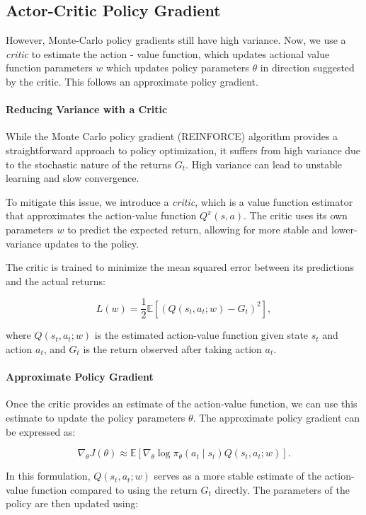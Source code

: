 \documentclass[10pt, oneside]{article}
\theoremstyle{definition}
\begin{document}
\subsection{Actor-Critic Policy Gradient}
However, Monte-Carlo policy gradients still have high variance. Now, we use a \textit{critic} to estimate the action - value function, which updates actional value function parameters $w$ which updates policy parameters $\theta$ in direction suggested by the critic. This follows an approximate policy gradient. 


\paragraph{Reducing Variance with a Critic}

While the Monte Carlo policy gradient (REINFORCE) algorithm provides a straightforward approach to policy optimization, it suffers from high variance due to the stochastic nature of the returns \( G_t \). High variance can lead to unstable learning and slow convergence.

To mitigate this issue, we introduce a \textit{critic}, which is a value function estimator that approximates the action-value function \( Q^\pi(s, a) \). The critic uses its own parameters \( w \) to predict the expected return, allowing for more stable and lower-variance updates to the policy.

The critic is trained to minimize the mean squared error between its predictions and the actual returns:

\[
L(w) = \frac{1}{2} \mathbb{E} \left[ \left( Q(s_t, a_t; w) - G_t \right)^2 \right],
\]

where \( Q(s_t, a_t; w) \) is the estimated action-value function given state \( s_t \) and action \( a_t \), and \( G_t \) is the return observed after taking action \( a_t \).

\paragraph{Approximate Policy Gradient}

Once the critic provides an estimate of the action-value function, we can use this estimate to update the policy parameters \( \theta \). The approximate policy gradient can be expressed as:

\[
\nabla_\theta J(\theta) \approx \mathbb{E} \left[ \nabla_\theta \log \pi_\theta(a_t \mid s_t) Q(s_t, a_t; w) \right].
\]

In this formulation, \( Q(s_t, a_t; w) \) serves as a more stable estimate of the action-value function compared to using the return \( G_t \) directly. The parameters of the policy are then updated using:
\end{document}
